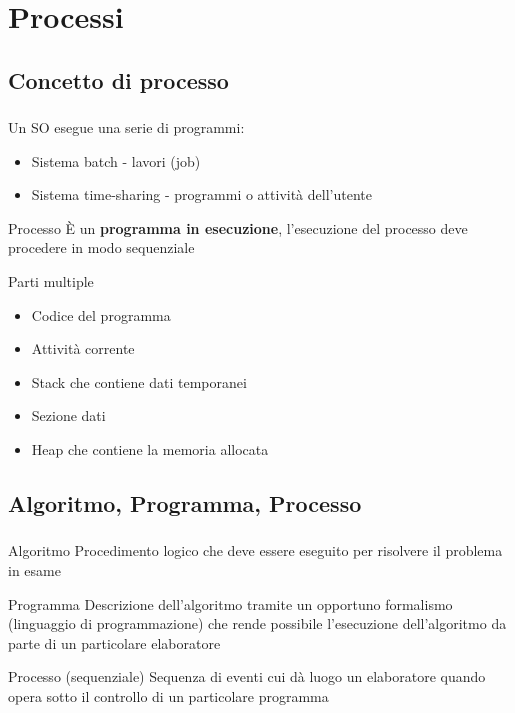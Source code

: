 \documentclass{beamer}
\newenvironment{mainframe}{
	\begin{frame}
		\frametitle{\insertsubsection}
		\framesubtitle{\insertsection}
	}{
	\end{frame}
}
\begin{document}
\section{Processi}
\subsection{Concetto di processo}
\begin{mainframe}
	Un SO esegue una serie di programmi:
	\begin{itemize}
		\item Sistema batch - lavori (job)
		\item Sistema time-sharing - programmi o attività dell'utente
	\end{itemize}
	\begin{block}{Processo}
		È un \textbf{programma in esecuzione}, l'esecuzione del processo deve procedere in modo sequenziale
	\end{block}
\end{mainframe}
\begin{frame}
	Parti multiple
	\begin{itemize}
		\item Codice del programma
		\item Attività corrente
		\item Stack che contiene dati temporanei
		\item Sezione dati
		\item Heap che contiene la memoria allocata
	\end{itemize}
\end{frame}
\subsection{Algoritmo, Programma, Processo}
\begin{mainframe}
	\begin{block}{Algoritmo}
		Procedimento logico che deve essere eseguito per risolvere il problema in esame
	\end{block}
	\begin{block}{Programma}
		Descrizione dell'algoritmo tramite un opportuno formalismo (linguaggio di programmazione) che rende possibile l'esecuzione dell'algoritmo da parte di un particolare elaboratore
	\end{block}
	\begin{block}{Processo (sequenziale)}
		Sequenza di eventi cui dà luogo un elaboratore quando opera sotto il controllo di un particolare programma
	\end{block}
\end{mainframe}
\end{document}
